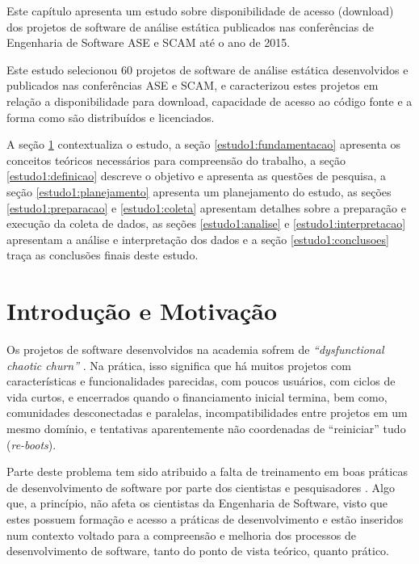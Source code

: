 {Este capítulo apresenta um estudo sobre disponibilidade de acesso (download)
dos projetos de software de análise estática publicados nas conferências de
Engenharia de Software ASE e SCAM até o ano de 2015.}
\label{estudo1}

Este estudo selecionou 60 projetos de software de análise estática desenvolvidos 
e publicados nas conferências ASE e SCAM, e caracterizou estes projetos em relação 
a disponibilidade para download, capacidade de acesso ao código fonte e 
a forma como são distribuídos e licenciados.

A seção \ref{estudo1:introducao} contextualiza o estudo,
a seção \ref{estudo1:fundamentacao} apresenta os conceitos teóricos necessários para compreensão do trabalho,
a seção \ref{estudo1:definicao} descreve o objetivo e apresenta as questões de pesquisa,
a seção \ref{estudo1:planejamento} apresenta um planejamento do estudo,
as seções \ref{estudo1:preparacao} e \ref{estudo1:coleta} apresentam detalhes sobre a preparação e execução da coleta de dados,
as seções \ref{estudo1:analise} e \ref{estudo1:interpretacao} apresentam a análise e interpretação dos dados e
a seção \ref{estudo1:conclusoes} traça as conclusões finais deste estudo.

\section{Introdução e Motivação} \label{estudo1:introducao} %

Os projetos de software desenvolvidos na academia sofrem de {\it
``dysfunctional chaotic churn''} \cite{howison2015understanding}.
Na prática, isso significa que há muitos projetos com características e
funcionalidades parecidas, com poucos usuários, com ciclos de vida curtos, e
encerrados quando o financiamento inicial termina, bem como, comunidades
desconectadas e paralelas, incompatibilidades entre projetos em um mesmo
domínio, e tentativas aparentemente não coordenadas de ``reiniciar'' tudo ({\it re-boots}). 
 
Parte deste problema tem sido atribuido a falta de treinamento em boas práticas
de desenvolvimento de software por parte dos cientistas e pesquisadores
\cite{wilson2017good}. Algo que, a princípio, não afeta os cientistas da
Engenharia de Software, visto que estes possuem formação e acesso a práticas de
desenvolvimento e estão inseridos num contexto voltado para a compreensão e
melhoria dos processos de desenvolvimento de software, tanto do ponto de vista
teórico, quanto prático.

